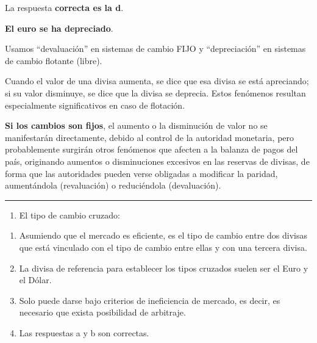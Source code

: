 \documentclass[
  letterpaper,
  DIV=11,
  numbers=noendperiod]{scrreprt}
\providecommand{\tightlist}{%
  \setlength{\itemsep}{0pt}\setlength{\parskip}{0pt}}\usepackage{longtable,booktabs,array}
\begin{document}
\begin{tcolorbox}[enhanced jigsaw, left=2mm, opacityback=0, colback=white, breakable, arc=.35mm, bottomrule=.15mm, rightrule=.15mm, toprule=.15mm, leftrule=.75mm, colframe=quarto-callout-tip-color-frame]
\begin{minipage}[t]{5.5mm}
\textcolor{quarto-callout-tip-color}{\faLightbulb}
\end{minipage}%
\begin{minipage}[t]{\textwidth - 5.5mm}

La respuesta \textbf{correcta es la d}.

\textbf{El euro se ha depreciado}.

Usamos ``devaluación'' en sistemas de cambio FIJO y ``depreciación'' en
sistemas de cambio flotante (libre).

Cuando el valor de una divisa aumenta, se dice que esa divisa se está
apreciando; si su valor disminuye, se dice que la divisa se deprecia.
Estos fenómenos resultan especialmente significativos en caso de
flotación.

\textbf{Si los cambios son fijos}, el aumento o la disminución de valor
no se manifestarán directamente, debido al control de la autoridad
monetaria, pero probablemente surgirán otros fenómenos que afecten a la
balanza de pagos del país, originando aumentos o disminuciones excesivos
en las reservas de divisas, de forma que las autoridades pueden verse
obligadas a modificar la paridad, aumentándola (revaluación) o
reduciéndola (devaluación).

\end{minipage}%
\end{tcolorbox}

\begin{center}\rule{0.5\linewidth}{0.5pt}\end{center}

\begin{enumerate}
\def\labelenumi{\arabic{enumi}.}
\setcounter{enumi}{43}
\tightlist
\item
  El tipo de cambio cruzado:
\end{enumerate}

\begin{enumerate}
\def\labelenumi{\alph{enumi}.}
\item
  Asumiendo que el mercado es eficiente, es el tipo de cambio entre dos
  divisas que está vinculado con el tipo de cambio entre ellas y con una
  tercera divisa.
\item
  La divisa de referencia para establecer los tipos cruzados suelen ser
  el Euro y el Dólar.
\item
  Solo puede darse bajo criterios de ineficiencia de mercado, es decir,
  es necesario que exista posibilidad de arbitraje.
\item
  Las respuestas a y b son correctas.
\end{enumerate}
\end{document}
